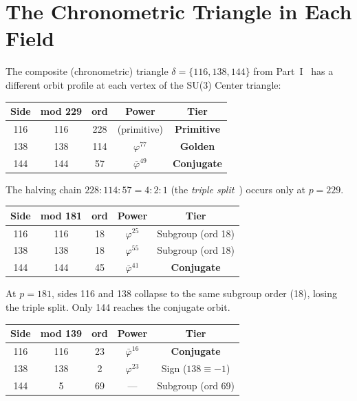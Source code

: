 \section{The Chronometric Triangle in Each Field}
\label{sec:chrono}

The composite (chronometric) triangle $\delta = \{116, 138, 144\}$
from Part~I~\cite{dwm_fst} has a different orbit profile at each
vertex of the SU(3) Center triangle:

\begin{center}
\begin{tabular}{@{}ccccc@{}}
\toprule
Side & mod 229 & ord & Power & Tier \\
\midrule
116 & 116 & 228 & (primitive) & \textbf{Primitive} \\
138 & 138 & 114 & $\varphi^{77}$ & \textbf{Golden} \\
144 & 144 &  57 & $\bar\varphi^{49}$ & \textbf{Conjugate} \\
\bottomrule
\end{tabular}
\end{center}

The halving chain $228 : 114 : 57 = 4 : 2 : 1$ (the
\emph{triple split}~\cite{dwm_fst})
occurs only at $p = 229$.

\begin{center}
\begin{tabular}{@{}ccccc@{}}
\toprule
Side & mod 181 & ord & Power & Tier \\
\midrule
116 & 116 & 18 & $\varphi^{25}$ & Subgroup (ord 18) \\
138 & 138 & 18 & $\varphi^{55}$ & Subgroup (ord 18) \\
144 & 144 & 45 & $\bar\varphi^{41}$ & \textbf{Conjugate} \\
\bottomrule
\end{tabular}
\end{center}

At $p = 181$, sides 116 and 138 collapse to the same subgroup order (18),
losing the triple split. Only 144 reaches the conjugate orbit.

\begin{center}
\begin{tabular}{@{}ccccc@{}}
\toprule
Side & mod 139 & ord & Power & Tier \\
\midrule
116 & 116 & 23 & $\bar\varphi^{16}$ & \textbf{Conjugate} \\
138 & 138 &  2 & $\varphi^{23}$ & Sign ($138 \equiv -1$) \\
144 &   5 & 69 & --- & Subgroup (ord 69) \\
\bottomrule
\end{tabular}
\end{center}

